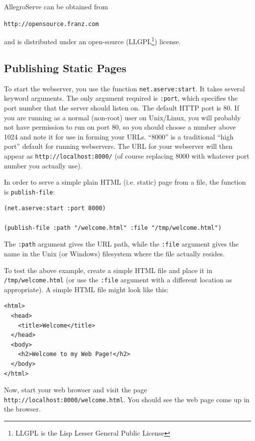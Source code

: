 AllegroServe can be obtained from

\begin{center}
\texttt{http://opensource.franz.com}
\end{center}

and is distributed under an open-source (LLGPL\footnote{LLGPL is the Lisp Lesser General Public License}) license.

\subsection{Publishing Static Pages}

To start the webserver, you use the function \texttt{net.aserve:start}. It takes several keyword
arguments. The only argument required is \texttt{:port}, which specifies the port number that
the server should listen on. The default HTTP port is 80. If you are running as a normal
(non-root) user on Unix/Linux, you will probably not have permission to run on port 80, so
you should choose a number above 1024 and note it for use in forming your URLs. ``8000''
is a traditional ``high port'' default for running webservers. The URL for your webserver
will then appear as \texttt{http://localhost:8000/} (of course replacing 8000 with whatever
port number you actually use).

In order to serve a simple plain HTML (i.e. static) page from a file, the function is
\texttt{publish-file}:

\begin{verbatim}
(net.aserve:start :port 8000)

(publish-file :path "/welcome.html" :file "/tmp/welcome.html")
\end{verbatim}

The \texttt{:path} argument gives the URL path, while the \texttt{:file} argument gives the name in
the Unix (or Windows) filesystem where the file actually resides.

To test the above example, create a simple HTML file and place it in \texttt{/tmp/welcome.html}
(or use the \texttt{:file} argument with a different location as appropriate). A simple HTML file
might look like this:

\begin{verbatim}
<html>
  <head>
    <title>Welcome</title>
  </head>
  <body>
    <h2>Welcome to my Web Page!</h2>
  </body>
</html>
\end{verbatim}

Now, start your web browser and visit the page \texttt{http://localhost:8000/welcome.html}.
You should see the web page come up in the browser.

